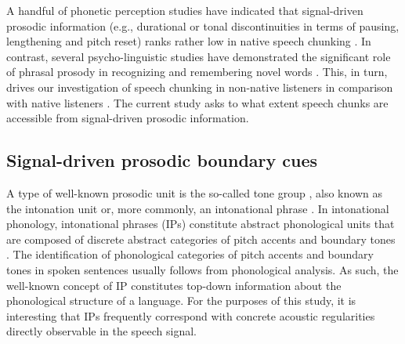 \documentclass[output=paper]{langscibook}
\begin{document}
	A handful of phonetic perception studies have indicated that signal-driven prosodic information (e.g., durational or tonal discontinuities in terms of pausing, lengthening and pitch reset) ranks rather low in native speech chunking \citep{coleEtAl2010, christodoulidesEtAl2018, duez1985}. In contrast, several psycho-linguistic studies have demonstrated the significant role of phrasal prosody in recognizing and remembering novel words \citep[][]{langusEtAl2012, ordinEtAl2017}. This, in turn, drives our investigation of speech chunking in non-native listeners in comparison with native listeners \citep[for a similar approach, see][]{himmelmannEtAl2018, riesbergEtAl2020}. The current study asks to what extent speech chunks are accessible from signal-driven prosodic information.
	
	\subsection{Signal-driven prosodic boundary cues}
	
	A type of well-known prosodic unit is the so-called tone group \citep{halliday1967a}, also known as the intonation unit \citep[][]{chafe1987} or, more commonly, an intonational phrase \citep{pierrehumbert1980, ladd2008}. In intonational phonology, intonational phrases (IPs) constitute abstract phonological units that are composed of discrete abstract categories of pitch accents and boundary tones \citep{ladd2008, pierrHirsch1990}. The identification of phonological categories of pitch accents and boundary tones in spoken sentences usually follows from phonological analysis. As such, the well-known concept of IP constitutes top-down information about the phonological structure of a language. For the purposes of this study, it is interesting that IPs frequently correspond with concrete acoustic regularities directly observable in the speech signal. 
	
\end{document}
